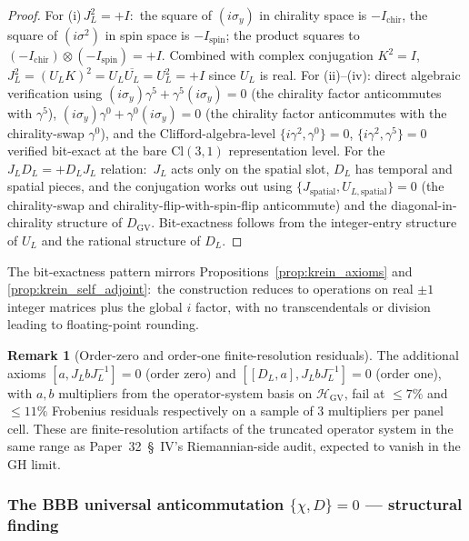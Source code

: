 \documentclass[11pt,a4paper]{article}
\theoremstyle{plain}
\theoremstyle{definition}
\newtheorem{remark}[theorem]{Remark}
\newcommand{\Hilb}{\mathcal{H}}
\newcommand{\DGV}{D_{\mathrm{GV}}}
\newcommand{\DL}{D_{L}}
\newcommand{\JL}{J_{L}}
\newcommand{\Cl}{\mathrm{Cl}}
\begin{document}
\begin{proof}
For (i)\,$\JL^2 = +I$:\ the square of $(i\sigma_y)$ in chirality space
is $-I_{\mathrm{chir}}$, the square of $(i\sigma^2)$ in spin space is
$-I_{\mathrm{spin}}$; the product squares to
$(-I_{\mathrm{chir}}) \otimes (-I_{\mathrm{spin}}) = +I$. Combined
with complex conjugation $K^2 = I$, $\JL^2 = (U_L K)^2 = U_L
\overline{U_L} = U_L^2 = +I$ since $U_L$ is real. For (ii)--(iv): direct
algebraic verification using $(i\sigma_y) \gamma^5 + \gamma^5
(i\sigma_y) = 0$ (the chirality factor anticommutes with $\gamma^5$),
$(i\sigma_y) \gamma^0 + \gamma^0 (i\sigma_y) = 0$ (the chirality
factor anticommutes with the chirality-swap $\gamma^0$), and the
Clifford-algebra-level $\{i\gamma^2, \gamma^0\} = 0$,
$\{i\gamma^2, \gamma^5\} = 0$ verified bit-exact at the bare
$\Cl(3, 1)$ representation level. For the $\JL D_L = +D_L \JL$
relation:\ $\JL$ acts only on the spatial slot, $\DL$ has temporal
and spatial pieces, and the conjugation works out using
$\{J_{\mathrm{spatial}}, U_{L, \mathrm{spatial}}\} = 0$ (the
chirality-swap and chirality-flip-with-spin-flip anticommute) and the
diagonal-in-chirality structure of $\DGV$. Bit-exactness follows from
the integer-entry structure of $U_L$ and the rational structure of
$\DL$.
\end{proof}

The bit-exactness pattern mirrors Propositions~\ref{prop:krein_axioms}
and \ref{prop:krein_self_adjoint}:\ the construction reduces to
operations on real $\pm 1$ integer matrices plus the global $i$ factor,
with no transcendentals or division leading to floating-point rounding.

\begin{remark}[Order-zero and order-one finite-resolution residuals]
\label{rem:order_zero_one}
The additional axioms $[a, \JL b \JL^{-1}] = 0$ (order zero) and
$[[\DL, a], \JL b \JL^{-1}] = 0$ (order one), with $a, b$ multipliers
from the operator-system basis on $\Hilb_{\mathrm{GV}}$, fail at
$\le 7\%$ and $\le 11\%$ Frobenius residuals respectively on a sample
of 3 multipliers per panel cell. These are finite-resolution
artifacts of the truncated operator system in the same range as
Paper~32~\S~IV's Riemannian-side audit, expected to vanish in the
GH limit.
\end{remark}

\subsubsection{The BBB universal anticommutation $\{\chi, D\} = 0$ — structural finding}
\end{document}
